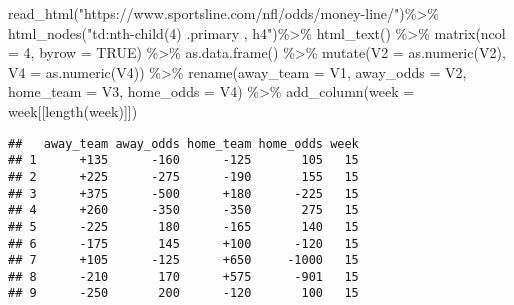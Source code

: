 \documentclass[
]{article}
\newenvironment{Shaded}{\begin{snugshade}}{\end{snugshade}}
\newcommand{\AttributeTok}[1]{\textcolor[rgb]{0.77,0.63,0.00}{#1}}
\newcommand{\ConstantTok}[1]{\textcolor[rgb]{0.00,0.00,0.00}{#1}}
\newcommand{\DecValTok}[1]{\textcolor[rgb]{0.00,0.00,0.81}{#1}}
\newcommand{\FunctionTok}[1]{\textcolor[rgb]{0.00,0.00,0.00}{#1}}
\newcommand{\NormalTok}[1]{#1}
\newcommand{\OtherTok}[1]{\textcolor[rgb]{0.56,0.35,0.01}{#1}}
\newcommand{\SpecialCharTok}[1]{\textcolor[rgb]{0.00,0.00,0.00}{#1}}
\newcommand{\StringTok}[1]{\textcolor[rgb]{0.31,0.60,0.02}{#1}}
\begin{document}
\begin{Shaded}
\begin{Highlighting}[]
\FunctionTok{read\_html}\NormalTok{(}\StringTok{"https://www.sportsline.com/nfl/odds/money{-}line/"}\NormalTok{)}\SpecialCharTok{\%\textgreater{}\%}
    \FunctionTok{html\_nodes}\NormalTok{(}\StringTok{"td:nth{-}child(4) .primary , h4"}\NormalTok{)}\SpecialCharTok{\%\textgreater{}\%}
    \FunctionTok{html\_text}\NormalTok{() }\SpecialCharTok{\%\textgreater{}\%} 
    \FunctionTok{matrix}\NormalTok{(}\AttributeTok{ncol =} \DecValTok{4}\NormalTok{, }\AttributeTok{byrow =} \ConstantTok{TRUE}\NormalTok{) }\SpecialCharTok{\%\textgreater{}\%}
    \FunctionTok{as.data.frame}\NormalTok{() }\SpecialCharTok{\%\textgreater{}\%} 
    \FunctionTok{mutate}\NormalTok{(}\AttributeTok{V2 =} \FunctionTok{as.numeric}\NormalTok{(V2), }\AttributeTok{V4 =} \FunctionTok{as.numeric}\NormalTok{(V4)) }\SpecialCharTok{\%\textgreater{}\%} 
    \FunctionTok{rename}\NormalTok{(}\StringTok{\textasciigrave{}}\AttributeTok{away\_team}\StringTok{\textasciigrave{}} \OtherTok{=}\NormalTok{ V1, }\StringTok{\textasciigrave{}}\AttributeTok{away\_odds}\StringTok{\textasciigrave{}} \OtherTok{=}\NormalTok{ V2, }\StringTok{\textasciigrave{}}\AttributeTok{home\_team}\StringTok{\textasciigrave{}} \OtherTok{=}\NormalTok{ V3, }\StringTok{\textasciigrave{}}\AttributeTok{home\_odds}\StringTok{\textasciigrave{}} \OtherTok{=}\NormalTok{ V4) }\SpecialCharTok{\%\textgreater{}\%} 
    \FunctionTok{add\_column}\NormalTok{(}\AttributeTok{week =}\NormalTok{ week[[}\FunctionTok{length}\NormalTok{(week)]])}
\end{Highlighting}
\end{Shaded}

\begin{verbatim}
##   away_team away_odds home_team home_odds week
## 1      +135      -160      -125       105   15
## 2      +225      -275      -190       155   15
## 3      +375      -500      +180      -225   15
## 4      +260      -350      -350       275   15
## 5      -225       180      -165       140   15
## 6      -175       145      +100      -120   15
## 7      +105      -125      +650     -1000   15
## 8      -210       170      +575      -901   15
## 9      -250       200      -120       100   15
\end{verbatim}
\end{document}
